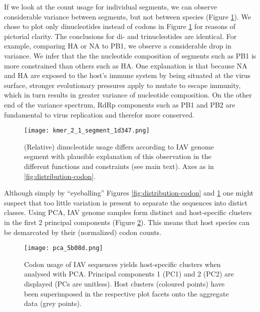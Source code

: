 If we look at the count usage for individual segments, we can observe considerable variance between segments, but not between species (Figure \ref{fig:distribution-2nt}). We chose to plot only dinucleotides instead of codons in Figure \ref{fig:distribution-2nt} for reasons of pictorial clarity. The conclusions for di- and trinucleotides are identical. For example, comparing HA or NA to PB1, we observe a considerable drop in variance. We infer that the the nucleotide composition of segments such as PB1 is more constrained than others such as HA. One explanation is that because NA and HA are exposed to the host's immune system by being situated at the virus surface, stronger evolutionary pressures apply to mutate to escape immunity, which in turn results in greater variance of nucleotide composition. On the other end of the variance spectrum, RdRp components such as PB1 and PB2 are fundamental to virus replication and therefor more conserved.


\begin{figure}[H]
    \texttt{[image: kmer\_2\_1\_segment\_1d347.png]}
    \caption[Dinucleotide usage of IAV genome segments.]{(Relative) dinucleotide usage differs according to IAV genome segment with plausible explanation of this observation in the different functions and constraints (see main text). Axes as in \ref{fig:distribution-codon}.}
    \label{fig:distribution-2nt}
\end{figure}


Although simply by ``eyeballing'' Figures \ref{fig:distribution-codon} and \ref{fig:distribution-2nt} one might suspect that too little variation is present to separate the sequences into distict classes. Using PCA, IAV genome samples form distinct and host-specific clusters in the first 2 principal components (Figure \ref{fig:pca1}). This means that host species can be demarcated by their (normalized) codon counts.


\begin{figure}[H]
    \begin{center}\texttt{[image: pca\_5b08d.png]}\end{center}
    \caption[Host-specific clusters of codon usage via PCA.]{Codon usage of IAV sequences yields host-specific clusters when analysed with PCA. Principal components 1 (PC1) and 2 (PC2) are displayed (PCs are unitless). Host clusters (coloured points) have been superimposed in the respective plot facets onto the aggregate data (grey points).}
    \label{fig:pca1}
\end{figure}



